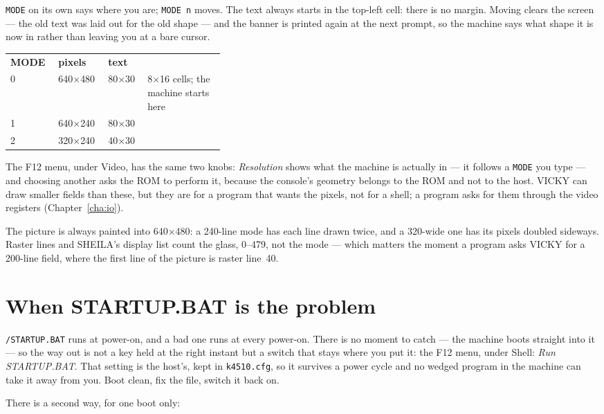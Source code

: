 \verb|MODE| on its own says where you are; \verb|MODE n| moves. The text
always starts in the top-left cell: there is no margin. Moving clears the
screen --- the old text was laid out for the old shape --- and the banner
is printed again at the next prompt, so the machine says what shape it is
now in rather than leaving you at a bare cursor.

\begin{tabular}{lllp{0.36\linewidth}}
\textbf{MODE} & \textbf{pixels} & \textbf{text} & \\
0 & 640$\times$480 & 80$\times$30 & 8$\times$16 cells; the machine starts here \\
1 & 640$\times$240 & 80$\times$30 & \\
2 & 320$\times$240 & 40$\times$30 & \\
\end{tabular}

The F12 menu, under Video, has the same two knobs: \emph{Resolution} shows
what the machine is actually in --- it follows a \verb|MODE| you type ---
and choosing another asks the ROM to perform it, because the console's
geometry belongs to the ROM and not to the host. VICKY can draw smaller
fields than these, but they are for a program that wants the pixels, not
for a shell; a program asks for them through the video registers
(Chapter~\ref{cha:io}).

The picture is always painted into 640$\times$480: a 240-line mode has
each line drawn twice, and a 320-wide one has its pixels doubled
sideways. Raster lines and SHEILA's display list count the glass,
0--479, not the mode --- which matters the moment a program asks VICKY
for a 200-line field, where the first line of the picture is raster
line~40.

\section{When STARTUP.BAT is the problem}\label{sec:badstartup}
\texttt{/STARTUP.BAT} runs at power-on, and a bad one runs at every
power-on. There is no moment to catch --- the machine boots straight into
it --- so the way out is not a key held at the right instant but a switch
that stays where you put it: the F12 menu, under Shell:
\emph{Run STARTUP.BAT}. That setting is the host's, kept in
\texttt{k4510.cfg}, so it survives a power cycle and no wedged program in
the machine can take it away from you. Boot clean, fix the file, switch it
back on.

There is a second way, for one boot only:

